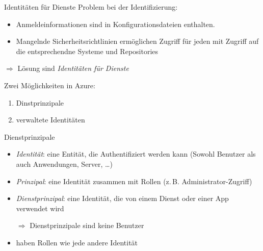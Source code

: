 \begin{flashcard}[\ ]{Identitäten für Dienste}
        Problem bei der Identifizierung:
        \begin{itemize}
            \item Anmeldeinformationen sind in Konfigurationsdateien enthalten.
            \item Mangelnde Sicherheitsrichtlinien ermöglichen Zugriff für jeden mit Zugriff auf die entsprechendne Systeme und Repositories
        \end{itemize}
        $\Rightarrow$ Lösung sind \emph{Identitäten für Dienste}

        Zwei Möglichkeiten in Azure:
        \begin{enumerate}
            \item Dinstprinzipale
            \item verwaltete Identitäten
        \end{enumerate}
\end{flashcard}

\begin{flashcard}[Definition]{Dienstprinzipale}
        \begin{itemize}
            \item \emph{Identität}: eine Entität, die Authentifiziert werden kann\newline
                (Sowohl Benutzer als auch Anwendungen, Server, …)
            \item \emph{Prinzipal}: eine Identität zusammen mit Rollen\newline
                (z.\,B. Administrator-Zugriff)
            \item \emph{Dienstprinzipal}: eine Identität, die von einem Dienst oder einer App verwendet wird
            \item[$\Rightarrow $] Dienstprinzipale sind keine Benutzer
            \item haben Rollen wie jede andere Identität
        \end{itemize}
\end{flashcard}

